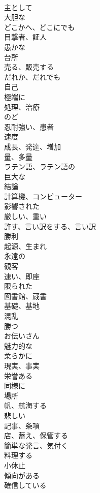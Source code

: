 \documentclass[8pt]{extreport}
\begin{document}
\begin{CJK}{UTF8}{min}
\\	主として
\\	大胆な
\\	どこかへ、どこにでも
\\	目撃者、証人
\\	愚かな
\\	台所
\\	売る、販売する
\\	だれか、だれでも
\\	自己
\\	極端に
\\	処理、治療
\\	のど
\\	忍耐強い、患者
\\	速度
\\	成長、発達、増加
\\	量、多量
\\	ラテン語、ラテン語の
\\	巨大な
\\	結論
\\	計算機、コンピューター
\\	影響された
\\	厳しい、重い
\\	許す、言い訳をする、言い訳
\\	勝利
\\	起源、生まれ
\\	永遠の
\\	観客
\\	速い、即座
\\	限られた
\\	図書館、蔵書
\\	基礎、基地
\\	混乱
\\	勝つ
\\	お伝いさん
\\	魅力的な
\\	柔らかに
\\	現実、事実
\\	栄誉ある
\\	同様に
\\	場所
\\	帆、航海する
\\	悲しい
\\	記事、条項
\\	店、蓄え、保管する
\\	簡単な発言、気付く
\\	料理する
\\	小休止
\\	傾向がある
\\	確信している

\end{CJK}
\end{document}
